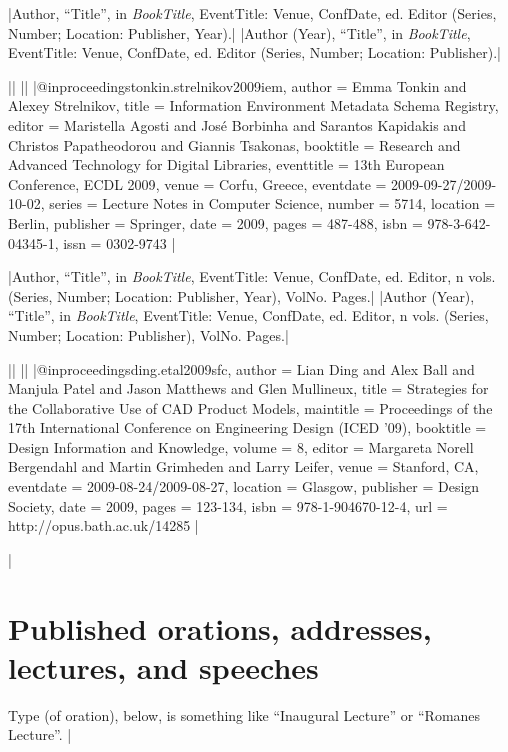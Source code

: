 \documentclass[extrafontsizes,11pt,a4paper,oneside]{memoir}
\newcommand*{\lit}[1]{\textsf{#1}}
\begin{document}
\specs
|Author, \enquote{Title}, \lit{in} \emph{BookTitle}, EventTitle: Venue, ConfDate, \lit{ed.} Editor (Series, Number; Location: Publisher, Year).|%
|Author (Year), \enquote{Title}, \lit{in} \emph{BookTitle}, EventTitle: Venue, ConfDate, \lit{ed.} Editor (Series, Number; Location: Publisher).|

\bibexample
||%
||%
|@inproceedings{tonkin.strelnikov2009iem,
  author = {Emma Tonkin and Alexey Strelnikov},
  title = {Information Environment Metadata Schema Registry},
  editor = {Maristella Agosti and José Borbinha and Sarantos Kapidakis and Christos Papatheodorou and Giannis Tsakonas},
  booktitle = {Research and Advanced Technology for Digital Libraries},
  eventtitle = {13th European Conference, ECDL 2009},
  venue = {Corfu, Greece},
  eventdate = {2009-09-27/2009-10-02},
  series = {Lecture Notes in Computer Science},
  number = {5714},
  location = {Berlin},
  publisher = {Springer},
  date = {2009},
  pages = {487-488},
  isbn = {978-3-642-04345-1},
  issn = {0302-9743}
}|

\specs
|Author, \enquote{Title}, \lit{in} \emph{BookTitle}, EventTitle: Venue, ConfDate, \lit{ed.} Editor, n \lit{vols.} (Series, Number; Location: Publisher, Year), VolNo. Pages.|%
|Author (Year), \enquote{Title}, \lit{in} \emph{BookTitle}, EventTitle: Venue, ConfDate, \lit{ed.} Editor, n \lit{vols.} (Series, Number; Location: Publisher), VolNo. Pages.|

\bibexample
||%
||%
|@inproceedings{ding.etal2009sfc,
  author = {Lian Ding and Alex Ball and Manjula Patel and Jason Matthews and Glen Mullineux},
  title = {Strategies for the Collaborative Use of CAD Product Models},
  maintitle = {Proceedings of the 17th International Conference on Engineering Design (ICED ’09)},
  booktitle = {Design Information and Knowledge},
  volume = {8},
  editor = {Margareta Norell Bergendahl and Martin Grimheden and Larry Leifer},
  venue = {Stanford, CA},
  eventdate = {2009-08-24/2009-08-27},
  location = {Glasgow},
  publisher = {Design Society},
  date = {2009},
  pages = {123-134},
  isbn = {978-1-904670-12-4},
  url = {http://opus.bath.ac.uk/14285}
}|

\todoc|
\section{Published orations, addresses, lectures, and speeches}

Type (of oration), below, is something like \enquote{Inaugural Lecture} or \enquote{Romanes Lecture}.
|
\end{document}
